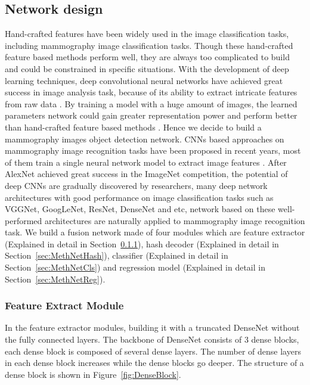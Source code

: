 \documentclass[12pt]{article}
\begin{document}
\subsection{Network design}
\label{sec:MethNet}

Hand-crafted features have been widely used in the
image classification tasks, including mammography 
image classification tasks. Though these 
hand-crafted feature based methods perform well, 
they are always too complicated to build and could 
be constrained in specific situations. With the 
development of deep learning techniques, deep 
convolutional neural networks have achieved 
great success in image analysis task, because of 
its ability to extract intricate features from 
raw data
\citep{Szegedy2016,Zeiler2014}.
By training a model with a huge amount of images, 
the learned parameters network could gain greater 
representation power and perform better than 
hand-crafted feature based methods
\citep{Jamieson2012}.
Hence we decide to build a mammography images 
object detection network. CNNs based approaches 
on mammography image 
recognition tasks have been proposed in recent 
years, most of them train a single neural network 
model to extract image features
\citep{He2019}.
After AlexNet achieved great success in the 
ImageNet competition, the potential of deep CNNs 
are gradually discovered by researchers, many deep 
network architectures with good performance on 
image classification tasks such as VGGNet, 
GoogLeNet, ResNet, DenseNet and etc, network 
based on these well-performed architectures are 
naturally applied to mammography image recognition 
task. We build a fusion network made of four 
modules which are feature extractor (Explained 
in detail in 
Section~\ref{sec:MethNetFea}), 
hash decoder (Explained in detail in 
Section~\ref{sec:MethNetHash}),
classifier (Explained in detail in 
Section~\ref{sec:MethNetCls}) 
and regression model (Explained in detail in 
Section~\ref{sec:MethNetReg}). 

\subsubsection{Feature Extract Module}
\label{sec:MethNetFea}

In the feature extractor modules, building it 
with a truncated DenseNet without the fully 
connected layers. The backbone of DenseNet
consists of 3 dense blocks, each dense block 
is composed of several dense layers. The 
number of dense layers in each dense block 
increases while the dense blocks go deeper.
The structure of a dense block is shown in 
Figure~\ref{fig:DenseBlock}.
\end{document}
